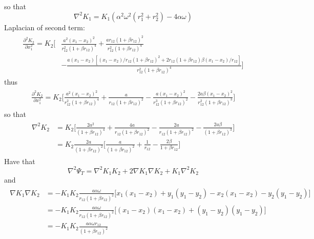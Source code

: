 \documentclass[english, a4paper]{article}
\begin{document}
so that
\begin{equation}
 \nabla^2 K_1 = K_1 (\alpha^2 \omega^2 (r_1^2 + r_2^2) - 4\alpha \omega)
\end{equation}
Laplacian of second term:
\begin{align}
\begin{split}
 \frac{\partial^2 K_2}{\partial x_1^2} = K_2 \Biggr[&\frac{a^2(x_1-x_2)^2}{r_{12}^2(1 + \beta r_{12})^4} +
 \frac{ar_{12}(1 + \beta r_{12})^2}{r_{12}^2(1 + \beta r_{12})^4} \\
 &-\frac{a(x_1 - x_2)[(x_1-x_2)/r_{12} (1 + \beta r_{12})^2 + 2r_{12}(1 + \beta r_{12})\beta(x_1-x_2)/r_{12}]}
 {r_{12}^2(1 + \beta r_{12})^4} \Biggr]
\end{split}
\end{align}
thus
\begin{align}
\begin{split}
 \frac{\partial^2 K_2}{\partial x_1^2} = K_2 \Biggr[\frac{a^2(x_1-x_2)^2}{r_{12}^2(1 + \beta r_{12})^4} +
 \frac{a}{r_{12}(1 + \beta r_{12})^2} 
 -\frac{a(x_1 - x_2)^2}{r_{12}^3(1 + \beta r_{12})^2}
 - \frac{2a\beta(x_1 - x_2)^2} {r_{12}^2(1 + \beta r_{12})^3} \Biggr]
\end{split}
\end{align}
so that
\begin{align}
\begin{split}
 \nabla^2 K_2 &= K_2\Biggr[\frac{2a^2}{(1 + \beta r_{12})^4} + \frac{4a}{r_{12}(1 + \beta r_{12})^2}
              - \frac{2a}{r_{12}(1 + \beta r_{12})^2} - \frac{2a\beta}{(1 + \beta r_{12})^3} \Biggr] \\
              &= K_2\frac{2a}{(1+\beta r_{12})^2}\Biggr[ \frac{a}{(1+\beta r_{12})^2} + 
              \frac{1}{r_{12}} - \frac{2\beta}{1 + \beta r_{12}} \Biggr]
\end{split}
\end{align}
Have that
\begin{equation}
 \nabla^2 \Psi_T = \nabla^2K_1K_2 + 2\nabla K_1\nabla K_2 + K_1\nabla^2K_2
\end{equation}
and
\begin{align}
\begin{split}
 \nabla K_1 \nabla K_2 &= -K_1K_2 \frac{a\alpha \omega}{r_{12}(1+\beta r_{12})^2}
 \Bigr[x_1(x_1 - x_2) + y_1(y_1 - y_2) - x_2(x_1 - x_2) - y_2(y_1 - y_2)\Bigr] \\
 &= -K_1K_2 \frac{a\alpha \omega}{r_{12}(1+\beta r_{12})^2}
 \Bigr[(x_1 - x_2)(x_1 - x_2) + (y_1 - y_2)(y_1 - y_2)\Bigr] \\
 &= -K_1K_2 \frac{a\alpha \omega r_{12}}{(1+\beta r_{12})^2}
\end{split}
\end{align}
\end{document}
